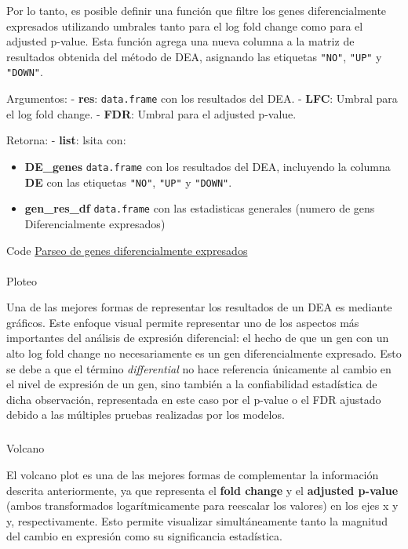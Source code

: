 \documentclass[
  9pt,
]{article}
\makeatletter
\let\oldparagraph\paragraph
\renewcommand{\paragraph}{
    \@ifstar
      \xxxParagraphStar
      \xxxParagraphNoStar
  }
\newcommand{\xxxParagraphStar}[1]{\oldparagraph*{#1}\mbox{}}
\newcommand{\xxxParagraphNoStar}[1]{\oldparagraph{#1}\mbox{}}
\let\oldsubparagraph\subparagraph
\renewcommand{\subparagraph}{
    \@ifstar
      \xxxSubParagraphStar
      \xxxSubParagraphNoStar
  }
\newcommand{\xxxSubParagraphStar}[1]{\oldsubparagraph*{#1}\mbox{}}
\newcommand{\xxxSubParagraphNoStar}[1]{\oldsubparagraph{#1}\mbox{}}
\makeatother
\begin{document}
Por lo tanto, es posible definir una función que filtre los genes
diferencialmente expresados utilizando umbrales tanto para el log fold
change como para el adjusted p-value. Esta función agrega una nueva
columna a la matriz de resultados obtenida del método de DEA, asignando
las etiquetas \texttt{"NO"}, \texttt{"UP"} y \texttt{"DOWN"}.

Argumentos: - \textbf{res}: \texttt{data.frame} con los resultados del
DEA. - \textbf{LFC}: Umbral para el log fold change. - \textbf{FDR}:
Umbral para el adjusted p-value.

Retorna: - \textbf{list}: lsita con:

\begin{itemize}
\item
  \textbf{DE\_genes} \texttt{data.frame} con los resultados del DEA,
  incluyendo la columna \textbf{DE} con las etiquetas \texttt{"NO"},
  \texttt{"UP"} y \texttt{"DOWN"}.
\item
  \textbf{gen\_res\_df} \texttt{data.frame} con las estadisticas
  generales (numero de gens Diferencialmente expresados)
\end{itemize}

Code \hyperref[parse_DE]{Parseo de genes diferencialmente expresados}

\paragraph{Ploteo}\label{ploteo}

Una de las mejores formas de representar los resultados de un DEA es
mediante gráficos. Este enfoque visual permite representar uno de los
aspectos más importantes del análisis de expresión diferencial: el hecho
de que un gen con un alto log fold change no necesariamente es un gen
diferencialmente expresado. Esto se debe a que el término
\emph{differential} no hace referencia únicamente al cambio en el nivel
de expresión de un gen, sino también a la confiabilidad estadística de
dicha observación, representada en este caso por el p-value o el FDR
ajustado debido a las múltiples pruebas realizadas por los modelos.

\subparagraph{Volcano}\label{volcano}

El volcano plot es una de las mejores formas de complementar la
información descrita anteriormente, ya que representa el \textbf{fold
change} y el \textbf{adjusted p-value} (ambos transformados
logarítmicamente para reescalar los valores) en los ejes x y y,
respectivamente. Esto permite visualizar simultáneamente tanto la
magnitud del cambio en expresión como su significancia estadística.
\end{document}
